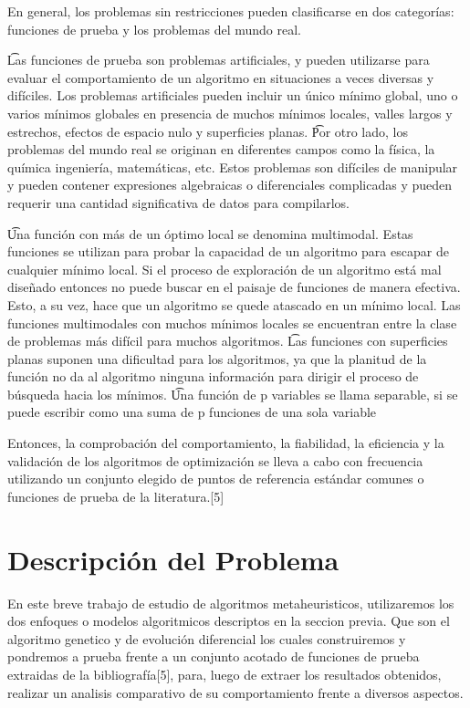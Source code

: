 \documentclass[10pt]{article}
\begin{document}
En general, los problemas sin restricciones pueden clasificarse en dos categorías: funciones de prueba y los problemas del mundo real.\newline

\t Las funciones de prueba son problemas artificiales, y pueden utilizarse para evaluar el comportamiento de un algoritmo en situaciones a veces diversas y difíciles. Los problemas artificiales pueden incluir un único mínimo global, uno o varios mínimos globales en presencia de muchos mínimos locales, valles largos y estrechos, efectos de espacio nulo y superficies planas. 
\t Por otro lado, los problemas del mundo real se originan en diferentes campos como la física, la química ingeniería, matemáticas, etc. Estos problemas son difíciles de manipular y pueden contener expresiones algebraicas o diferenciales complicadas y pueden requerir una cantidad significativa de datos para compilarlos.

\t Una función con más de un óptimo local se denomina multimodal. Estas funciones se utilizan para probar la capacidad de un algoritmo para escapar de cualquier mínimo local. Si el proceso de exploración de un algoritmo está mal diseñado entonces no puede buscar en el paisaje de funciones de manera efectiva. Esto, a su vez, hace que un algoritmo se quede atascado en un mínimo local. Las funciones multimodales con muchos mínimos locales se encuentran entre la clase de problemas más difícil para muchos algoritmos. 
\t Las funciones con superficies planas suponen una dificultad para los algoritmos, ya que la planitud de la función no da al algoritmo ninguna información para dirigir el proceso de búsqueda hacia los mínimos.\newline
\t Una función de p variables se llama separable, si se puede escribir como una suma de p funciones de una sola variable

Entonces, la comprobación del comportamiento, la fiabilidad, la eficiencia y la validación de los algoritmos de optimización se lleva a cabo con frecuencia utilizando un conjunto elegido de puntos de referencia estándar comunes o funciones de prueba de la literatura.[5]

\section{Descripción del Problema}

En este breve trabajo de estudio de algoritmos metaheuristicos, utilizaremos los dos enfoques o modelos algoritmicos descriptos en la seccion previa. Que son el algoritmo genetico y de evolución diferencial los cuales construiremos y pondremos a prueba frente a un conjunto acotado de funciones de prueba extraidas de la bibliografía[5], para, luego de extraer los resultados obtenidos, realizar un analisis comparativo de su comportamiento frente a diversos aspectos.
\end{document}
